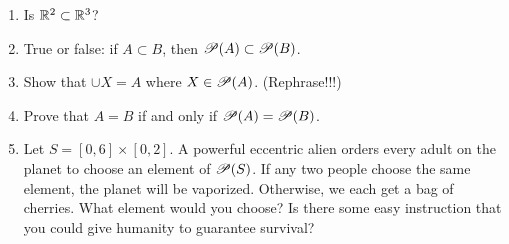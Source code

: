 \probsec{~\ref{sec:power-set}}
\begin{enumerate}
    \item Is $\mathbb{R}^2 \subset \mathbb{R}^3$?

    \item True or false: if $A \subset B$, then $\mathscr{P}(A) \subset \mathscr{P}(B)$.

    \item Show that $\cup X = A$ where $X \in \mathscr{P}(A)$. (Rephrase!!!)

    \item Prove that $A = B$ if and only if $\mathscr{P}(A) = \mathscr{P}(B)$.

    \item Let $S = [0,6] \times [0,2]$. A powerful eccentric alien orders every adult on the planet to choose an element of $\mathscr{P}(S)$. If any two people choose the same element, the planet will be vaporized. Otherwise, we each get a bag of cherries. What element would you choose? Is there some easy instruction that you could give humanity to guarantee survival?
\end{enumerate}
